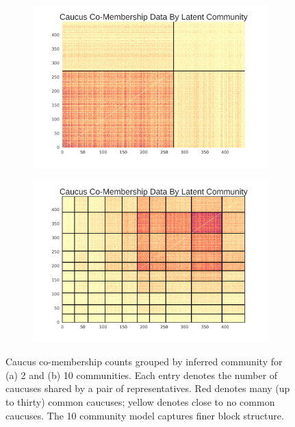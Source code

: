 \documentclass{article}
\begin{document}
\begin{figure}[h]
  \centering
    \begin{subfigure}[b]{0.45\textwidth}
        \includegraphics[width=\textwidth]{2_communities.png}
        \caption{}
        \label{2_comm}
    \end{subfigure}
    \begin{subfigure}[b]{0.45\textwidth}
        \includegraphics[width=\textwidth]{10_communities.png}
        \caption{}
        \label{10_comm}
    \end{subfigure}

  \caption{Caucus co-membership counts grouped by inferred community for (a) 2 and (b) 10 communities. Each entry denotes the number of caucuses shared by a pair of representatives. Red denotes many (up to thirty) common caucuses; yellow denotes close to no common caucuses. The 10 community model captures finer block structure.}
      \label{fig:lcipm_comm}
\end{figure}
\end{document}

